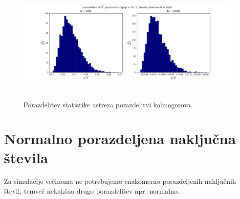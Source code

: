 \documentclass[11pt, a4paper]{article}
\begin{document}
\begin{figure}[H]
\hspace*{-2.5cm}  
  \includegraphics[width=22cm, height =6cm]{enakomerna_kolmogorov_3.png}
 \caption{Porazdelitev statistike ustreza porazdelitvi kolmogorova. }
\end{figure}

\section{Normalno porazdeljena naključna števila}
Za simulacije večinoma ne potrebujemo enakomerno porazdeljenih naključnih števil, temveč nekakšno drugo porazdelitev npr. normalno.
\end{document}
